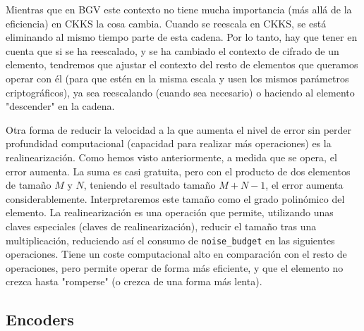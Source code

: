 Mientras que en BGV este contexto no tiene mucha importancia (más allá de la eficiencia) en CKKS la cosa cambia. Cuando se reescala en CKKS, se está eliminando al mismo tiempo parte de esta cadena. Por lo tanto, hay que tener en cuenta que si se ha reescalado, y se ha cambiado el contexto de cifrado de un elemento, tendremos que ajustar el contexto del resto de elementos que queramos operar con él (para que estén en la misma escala y usen los mismos parámetros criptográficos), ya sea reescalando (cuando sea necesario) o haciendo al elemento "descender" en la cadena.

Otra forma de reducir la velocidad a la que aumenta el nivel de error sin perder profundidad computacional (capacidad para realizar más operaciones) es la realinearización. Como hemos visto anteriormente, a medida que se opera, el error aumenta. La suma es casi gratuita, pero con el producto de dos elementos de tamaño $M$ y $N$, teniendo el resultado tamaño $M+N-1$, el error aumenta considerablemente. Interpretaremos este tamaño como el grado polinómico del elemento. La realinearización es una operación que permite, utilizando unas claves especiales (claves de realinearización), reducir el tamaño tras una multiplicación, reduciendo así el consumo de \verb|noise_budget| en las siguientes operaciones. Tiene un coste computacional alto en comparación con el resto de operaciones, pero permite operar de forma más eficiente, y que el elemento no crezca hasta "romperse" (o crezca de una forma más lenta).

\subsection{Encoders}

